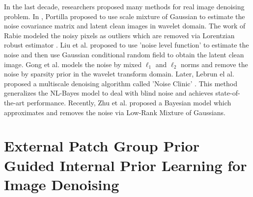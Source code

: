 \documentclass[10pt,twocolumn,letterpaper]{article}
\begin{document}
In the last decade, researchers proposed many methods \cite{fullyblind,rabie2005robust,Liu2008,almapg,noiseclinic,ncwebsite,Zhu_2016_CVPR,crosschannel2016} for real image denoising problem. In \cite{fullyblind}, Portilla proposed to use scale mixture of Gaussian to estimate the noise covariance matrix and latent clean images in wavelet domain. The work of Rabie \cite{rabie2005robust} modeled the noisy pixels as outliers which are removed via Lorentzian robust estimator \cite{huber2011robust}. Liu et al. \cite{Liu2008} proposed to use 'noise level function' to estimate the noise and then use Gaussian conditional random field to obtain the latent clean image. Gong et al. \cite{almapg} models the noise by mixed $\ell_{1}$ and $\ell_{2}$ norms and remove the noise by sparsity prior in the wavelet transform domain. Later, Lebrun el al. proposed a multiscale denoising algorithm called 'Noise Clinic' \cite{noiseclinic,ncwebsite}. This method generalizes the NL-Bayes model \cite{nlbayes} to deal with blind noise and achieves state-of-the-art performance. Recently, Zhu et al. proposed a Bayesian model \cite{Zhu_2016_CVPR} which approximates and removes the noise via Low-Rank Mixture of Gaussians.

\section{External Patch Group Prior Guided Internal Prior Learning for Image Denoising}
\end{document}
